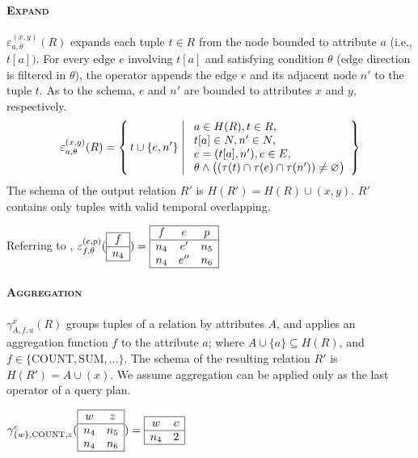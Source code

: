 \paragraph{\textbf{\textsc{Expand}}} $\varepsilon_{a,\theta}^{(x,y)}(R)$ expands each tuple $t\in R$ from the node bounded to attribute $a$ (i.e., $t[a])$.
For every edge $e$ involving $t[a]$ and satisfying condition $\theta$ (edge direction is filtered in $\theta$), the operator appends the edge $e$ and its adjacent node $n'$ to the tuple $t$.
As to the schema, $e$ and $n'$ are bounded to attributes $x$ and $y$, respectively.
\[
\varepsilon_{a,\theta}^{(x,y)}(R)=
\left\{
\,t \cup \{e,n'\}\;\middle|\;
\begin{array}{l}
a \in H(R), t\in R,\\
t[a] \in N, n' \in N,\\
e=(t[a],n'),e\in E,\\
\theta \land \big((\tau(t) \cap \tau(e) \cap \tau(n')) \ne \varnothing\big)
\end{array}
\right\}
\]
The schema of the output relation $R'$ is $H(R') = H(R) \cup (x, y)$.
$R'$ contains only tuples with valid temporal overlapping.
\begin{example}
Referring to , 
{\small
$\varepsilon_{f,\theta}^{(e,p)}(
\begin{array}{|c|}
\hline
f \\
\hline
n_4\\
\hline
\end{array}
)=\begin{array}{|ccc|}
\hline
f & e & p \\
\hline
n_4  &e'& n_5 \\
n_4  &e''& n_6 \\
\hline
\end{array}$
}
\end{example}
\paragraph{\textbf{\textsc{Aggregation}}} $\gamma^x_{A,f,a}(R)$ groups tuples of a relation by attributes $A$, and applies an aggregation function $f$ to the attribute $a$; where $A \cup \{a\} \subseteq H(R)$, and $f \in \{\mathrm{COUNT}, \mathrm{SUM}, \ldots\}$.
The schema of the resulting relation $R'$ is $H(R') = A \cup (x)$.
We assume aggregation can be applied only as the last operator of a query plan.
\begin{example}
{\small
$\gamma_{\{w\},\mathrm{COUNT},z}^{c}(
\begin{array}{|cc|}
\hline
w & z \\
\hline
n_4  & n_5 \\
n_4  & n_6 \\
\hline
\end{array}
)=\begin{array}{|cc|}
\hline
w & c \\
\hline
n_4  & 2 \\
\hline
\end{array}$
}
\end{example}
